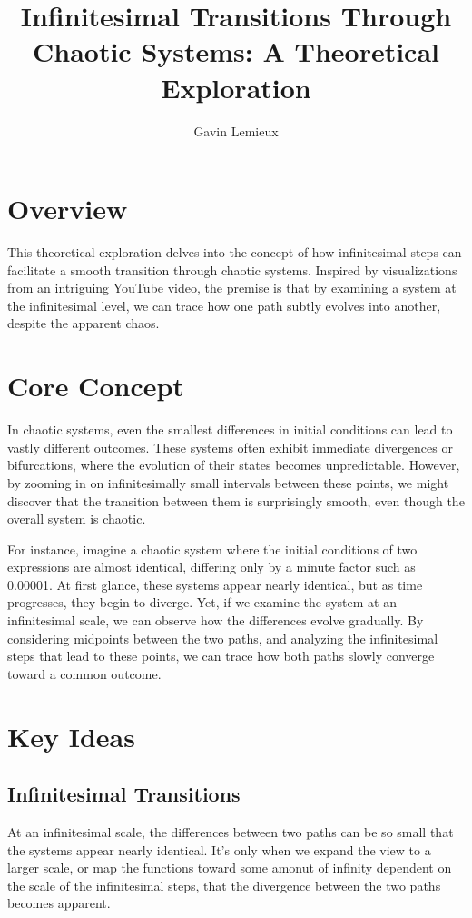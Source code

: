 \documentclass[11pt, a4paper]{article}
\title{Infinitesimal Transitions Through Chaotic Systems: A Theoretical Exploration}
\author{Gavin Lemieux}
\date{}
\begin{document}
	\maketitle

	\section{Overview}
	This theoretical exploration delves into the concept of how infinitesimal steps can facilitate a smooth transition through chaotic systems. Inspired by visualizations from an intriguing YouTube video, the premise is that by examining a system at the infinitesimal level, we can trace how one path subtly evolves into another, despite the apparent chaos.

	\section{Core Concept}
	In chaotic systems, even the smallest differences in initial conditions can lead to vastly different outcomes. These systems often exhibit immediate divergences or bifurcations, where the evolution of their states becomes unpredictable. However, by zooming in on infinitesimally small intervals between these points, we might discover that the transition between them is surprisingly smooth, even though the overall system is chaotic.

	For instance, imagine a chaotic system where the initial conditions of two expressions are almost identical, differing only by a minute factor such as 0.00001. At first glance, these systems appear nearly identical, but as time progresses, they begin to diverge. Yet, if we examine the system at an infinitesimal scale, we can observe how the differences evolve gradually. By considering midpoints between the two paths, and analyzing the infinitesimal steps that lead to these points, we can trace how both paths slowly converge toward a common outcome.

	\section{Key Ideas}
	\subsection{Infinitesimal Transitions}
		At an infinitesimal scale, the differences between two paths can be so small that the systems appear nearly identical. It’s only when we expand the view to a larger scale, or map the functions toward some amonut of infinity dependent on the scale of the infinitesimal steps, that the divergence between the two paths becomes apparent.
\end{document}
